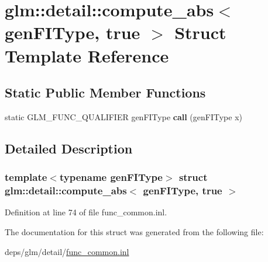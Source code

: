 \hypertarget{structglm_1_1detail_1_1compute__abs_3_01genFIType_00_01true_01_4}{}\section{glm\+:\+:detail\+:\+:compute\+\_\+abs$<$ gen\+F\+I\+Type, true $>$ Struct Template Reference}
\label{structglm_1_1detail_1_1compute__abs_3_01genFIType_00_01true_01_4}
\subsection*{Static Public Member Functions}
\begin{DoxyCompactItemize}
\item 
\mbox{\label{structglm_1_1detail_1_1compute__abs_3_01genFIType_00_01true_01_4_aa71d12c5d1f14e48f3be96bdf6b95861}} 
static G\+L\+M\+\_\+\+F\+U\+N\+C\+\_\+\+Q\+U\+A\+L\+I\+F\+I\+ER gen\+F\+I\+Type {\bfseries call} (gen\+F\+I\+Type x)
\end{DoxyCompactItemize}


\subsection{Detailed Description}
\subsubsection*{template$<$typename gen\+F\+I\+Type$>$\newline
struct glm\+::detail\+::compute\+\_\+abs$<$ gen\+F\+I\+Type, true $>$}



Definition at line 74 of file func\+\_\+common.\+inl.



The documentation for this struct was generated from the following file\+:\begin{DoxyCompactItemize}
\item 
deps/glm/detail/\hyperlink{func__common_8inl}{func\+\_\+common.\+inl}\end{DoxyCompactItemize}
